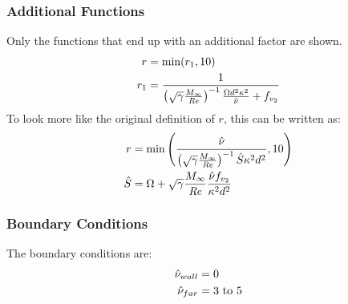 \documentclass{SelimArticle}
\begin{document}
\subsubsection{Additional Functions}
Only the functions that end up with an additional factor are shown.
\begin{align}
\begin{split}
    r &= \min(r_1, 10)\\
    r_1 &= \frac{1}{\left( \sqrt{\gamma}\frac{M_\infty}{\mathit{Re}} \right)^{-1}\frac{\Omega d^2 \kappa^2}{\hat{\nu}} + f_{v_2}}
\end{split}
\end{align}
To look more like the original definition of $r$, this can be written as:
\begin{align}
    r &= \min\left(\dfrac{\hat{\nu}}{\left( \sqrt{\gamma}\frac{M_\infty}{\mathit{Re}} \right)^{-1}\hat{S}\kappa^2d^2}, 10\right)\\
    \hat{S} &= \Omega +  \sqrt{\gamma}\frac{M_\infty}{\mathit{Re}} \frac{\hat{\nu} f_{v_2}}{\kappa^2 d^2}
\end{align}
\subsubsection{Boundary Conditions}
The boundary conditions are:
\begin{align}
    \hat{\nu}_{wall} &= 0\\
    \hat{\nu}_{far}  &= 3~ \text{to}~ 5
\end{align}
\end{document}
